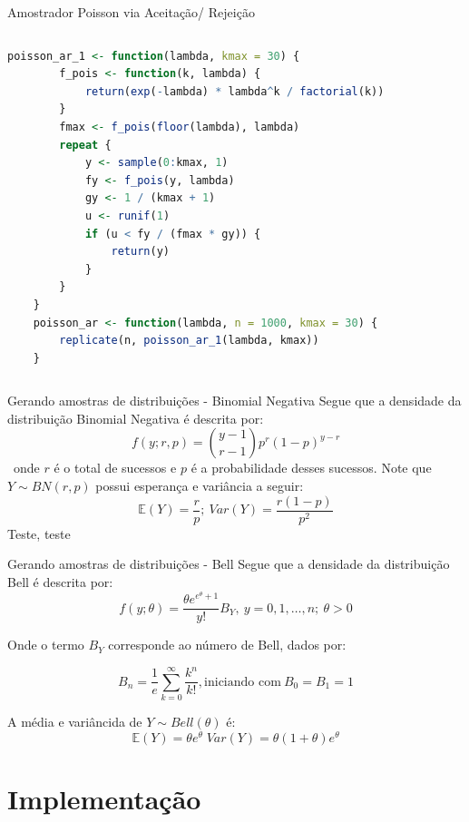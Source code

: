 \documentclass{beamer} %
\begin{document}
\begin{frame}[fragile]{Amostrador Poisson via Aceitação/ Rejeição}
	\begin{columns}
		
		\begin{column}{0.85\textwidth}
			\begin{lstlisting}[language=R]
	poisson_ar_1 <- function(lambda, kmax = 30) {
		f_pois <- function(k, lambda) {
			return(exp(-lambda) * lambda^k / factorial(k))
		}	
		fmax <- f_pois(floor(lambda), lambda) 
		repeat {	
			y <- sample(0:kmax, 1)
			fy <- f_pois(y, lambda)		
			gy <- 1 / (kmax + 1)				
			u <- runif(1)
			if (u < fy / (fmax * gy)) {
				return(y)
			}
		}
	}
	poisson_ar <- function(lambda, n = 1000, kmax = 30) {
		replicate(n, poisson_ar_1(lambda, kmax))
	}
			\end{lstlisting}
		\end{column}
		
		\begin{column}{0.15\textwidth}
		\href{https://github.com/andresavassi/MCCD2-Exercicios/tree/main/Slides%20-%20Trabalho%201/poisson_ar.R}{\beamergotobutton{Código.R}}
		
		\vspace{0.5cm}
		
		\end{column}
	
	\end{columns}
\end{frame}




	\begin{frame}{Gerando amostras de distribuições - Binomial Negativa}
		Segue que a densidade da distribuição Binomial Negativa é descrita por:
		$$f(y; r,p) = \binom{y-1}{r-1} p^r(1-p)^{y-r}$$
		\ onde $r$ é o total de sucessos e $p$ é a probabilidade desses sucessos.
		Note que $Y \sim BN(r,p)$ possui esperança e variância a seguir:
		$$
		\mathbb{E}(Y) = \frac{r}{p} ;\ Var(Y) = \frac{r(1-p)}{p^2}
		$$
		Teste, teste
		
	\end{frame}


	\begin{frame}{Gerando amostras de distribuições - Bell}
		Segue que a densidade da distribuição Bell é descrita por:
		$$
		f(y; \theta) = \frac{\theta e^{e^{\theta} + 1}}{y!} B_Y,\ y = 0, 1, \dots, n; \ \theta > 0
		$$
		
		Onde o termo $B_Y$ corresponde ao número de Bell, dados por:
		
		$$
		B_n= \frac{1}{e} \sum_{k = 0}^{\infty} \frac{k^n}{k!}, \text{iniciando com}\ B_0 = B_1 = 1
		$$
		
		A média e variâncida de $Y \sim Bell(\theta)$ é:
		$$
		\mathbb{E}(Y) = \theta e^{\theta}
		\;
		Var(Y) = \theta(1+\theta)e^{\theta}
		$$
		
	\end{frame}

\section{Implementação}
	
\end{document}
